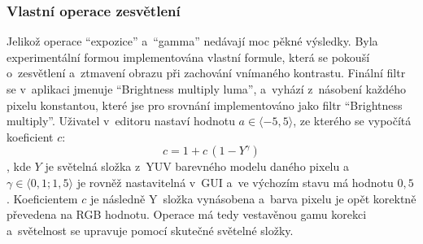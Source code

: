 \documentclass[11pt, a4paper, titlepage]{article}
\renewcommand{\uv}[1]{``#1''}
\begin{document}
\subsubsection{Vlastní operace zesvětlení}
Jelikož operace \uv{expozice} a~\uv{gamma} nedávají moc pěkné výsledky.
Byla experimentální formou implementována vlastní formule, která se pokouší o~zesvětlení a~ztmavení obrazu při zachování vnímaného kontrastu.
Finální filtr se v~aplikaci jmenuje \uv{Brightness multiply luma}, a~vyhází z~násobení každého pixelu konstantou, které jse pro srovnání implementováno jako filtr \uv{Brightness multiply}.
Uživatel v~editoru nastaví hodnotu $a \in \langle-5,5\rangle$, ze kterého se vypočítá koeficient $c$:
$$c=1+c\,(1 - Y^\gamma)$$
, kde $Y$ je světelná složka z~YUV barevného modelu\cite{wiki:YCbCr} daného pixelu a~$\gamma \in \langle0,1;1,5\rangle$ je rovněž nastavitelná v~GUI a~ve výchozím stavu má hodnotu $0,5$.
Koeficientem $c$ je následně Y~složka vynásobena a~barva pixelu je opět korektně převedena na RGB hodnotu.
Operace má tedy vestavěnou gamu korekci a~světelnost se upravuje pomocí skutečné světelné složky.
\end{document}
